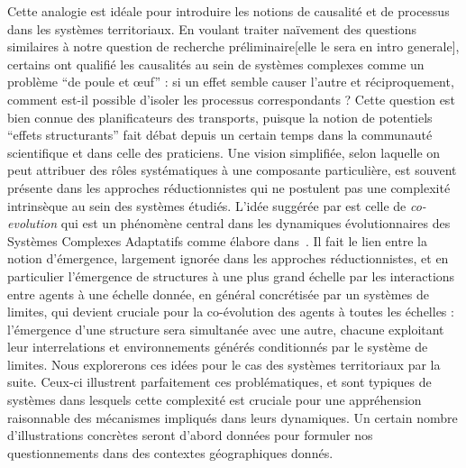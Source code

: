 {Cette analogie est idéale pour introduire les notions de causalité et de processus dans les systèmes territoriaux. En voulant traiter naïvement des questions similaires à notre question de recherche préliminaire[elle le sera en intro generale], certains ont qualifié les causalités au sein de systèmes complexes comme un problème ``de poule et {\oe}uf'' : si un effet semble causer l'autre et réciproquement, comment est-il possible d'isoler les processus correspondants ?  Cette question est bien connue des planificateurs des transports, puisque la notion de potentiels ``effets structurants'' fait débat depuis un certain temps dans la communauté scientifique  et dans celle des praticiens. Une vision simplifiée, selon laquelle on peut attribuer des rôles systématiques à une composante particulière, est souvent présente dans les approches réductionnistes qui ne postulent pas une complexité intrinsèque au sein des systèmes étudiés. L'idée suggérée par  est celle de \emph{co-evolution} qui est un phénomène central dans les dynamiques évolutionnaires des Systèmes Complexes Adaptatifs comme  élabore dans~\cite{holland2012signals}. Il fait le lien entre la notion d'émergence, largement ignorée dans les approches réductionnistes, et en particulier l'émergence de structures à une plus grand échelle par les interactions entre agents à une échelle donnée, en général concrétisée par un systèmes de limites, qui devient cruciale pour la co-évolution des agents à toutes les échelles : l'émergence d'une structure sera simultanée avec une autre, chacune exploitant leur interrelations et environnements générés conditionnés par le système de limites. Nous explorerons ces idées pour le cas des systèmes territoriaux par la suite. Ceux-ci illustrent parfaitement ces problématiques, et sont typiques de systèmes dans lesquels cette complexité est cruciale pour une appréhension raisonnable des mécanismes impliqués dans leurs dynamiques. Un certain nombre d'illustrations concrètes seront d'abord données pour formuler nos questionnements dans des contextes géographiques donnés.
}




